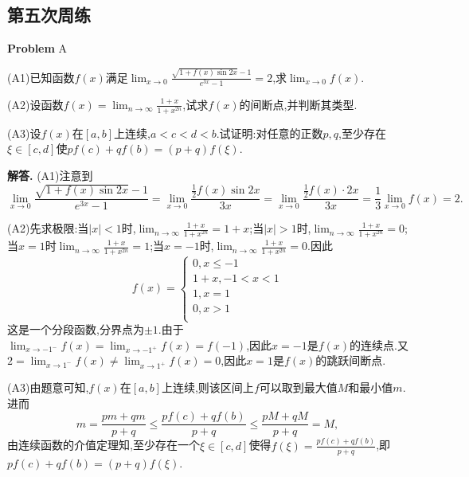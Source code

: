 \documentclass{article}
\newcounter{problemname}
\newenvironment{problem}{\begin{shaded}\stepcounter{problemname}\par\noindent\textbf{Problem }}{\end{shaded}\par}
\newenvironment{solution}{\par\noindent\textbf{解答. }}{\par}
\begin{document}
\subsection{第五次周练}
\begin{problem}{A}\par
(A1)已知函数$f(x)$满足$\lim_{x\rightarrow 0} \frac{\sqrt{1+f\left( x \right) \sin 2x}-1}{e^{3x}-1}=2$,求$\lim_{x\to 0}f(x)$.
\par
(A2)设函数$f\left( x \right) =\lim_{n\rightarrow \infty} \frac{1+x}{1+x^{2n}}$,试求$f(x)$的间断点,并判断其类型.\par
(A3)设$f(x)$在$[a,b]$上连续,$a<c<d<b$.试证明:对任意的正数$p,q$,至少存在$\xi\in[c,d]$使$pf\left( c \right) +qf\left( b \right) =\left( p+q \right) f\left( \xi \right) $.\par
\end{problem}
\begin{solution}
(A1)注意到
$$
\lim_{x\rightarrow 0} \frac{\sqrt{1+f\left( x \right) \sin 2x}-1}{e^{3x}-1}=\lim_{x\rightarrow 0} \frac{\frac{1}{2}f\left( x \right) \sin 2x}{3x}=\lim_{x\rightarrow 0} \frac{\frac{1}{2}f\left( x \right) \cdot 2x}{3x}=\frac{1}{3}\lim_{x\rightarrow 0} f\left( x \right) =2.
$$\par
(A2)先求极限:当$|x|<1$时,$\lim_{n\rightarrow \infty} \frac{1+x}{1+x^{2n}}=1+x$;当$|x|>1$时,$\lim_{n\rightarrow \infty} \frac{1+x}{1+x^{2n}}=0$;当$x=1$时$\lim_{n\rightarrow \infty} \frac{1+x}{1+x^{2n}}=1$;当$x=-1$时,$\lim_{n\rightarrow \infty} \frac{1+x}{1+x^{2n}}=0$.因此
$$
f\left( x \right) =\begin{cases}
	0,x\le -1\\
	1+x,-1<x<1\\
	1,x=1\\
	0,x>1\\
\end{cases}
$$
这是一个分段函数,分界点为$\pm 1$.由于$\lim_{x\rightarrow -1^-} f\left( x \right) =\lim_{x\rightarrow -1^+} f\left( x \right) =f\left( -1 \right) $,因此$x=-1$是$f(x)$的连续点.又$2=\lim_{x\rightarrow 1^-} f\left( x \right) \ne \lim_{x\rightarrow 1^+} f\left( x \right) =0$,因此$x=1$是$f(x)$的跳跃间断点.\par
(A3)由题意可知,$f(x)$在$[a,b]$上连续,则该区间上$f$可以取到最大值$M$和最小值$m$.进而
$$
m=\frac{pm+qm}{p+q}\le \frac{pf\left( c \right) +qf\left( b \right)}{p+q}\le \frac{pM+qM}{p+q}=M,
$$
由连续函数的介值定理知,至少存在一个$\xi\in[c,d]$使得$f\left( \xi \right) =\frac{pf\left( c \right) +qf\left( b \right)}{p+q}$,即$pf\left( c \right) +qf\left( b \right) =\left( p+q \right) f\left( \xi \right) $.
\end{solution}
\end{document}
